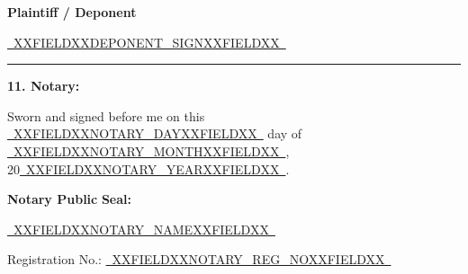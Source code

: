 \documentclass[12pt, a4paper]{article}
\newcommand{\fillline}[1]{\underline{~#1~}}
\begin{document}
\vspace{20pt}
\noindent\hfill \textbf{Plaintiff / Deponent}

\noindent\hfill \fillline{XXFIELDXXDEPONENT_SIGNXXFIELDXX}

\vspace{16pt}
\noindent\rule{\textwidth}{0.4pt}

\vspace{8pt}
\noindent \textbf{11. Notary:}

\vspace{6pt}
\noindent Sworn and signed before me on this \fillline{XXFIELDXXNOTARY_DAYXXFIELDXX} day of \fillline{XXFIELDXXNOTARY_MONTHXXFIELDXX}, 20\fillline{XXFIELDXXNOTARY_YEARXXFIELDXX}.

\vspace{30pt}
\noindent \textbf{Notary Public} \hspace{4cm} \textbf{Seal:}

\noindent \fillline{XXFIELDXXNOTARY_NAMEXXFIELDXX}

\noindent Registration No.: \fillline{XXFIELDXXNOTARY_REG_NOXXFIELDXX}
\end{document}
